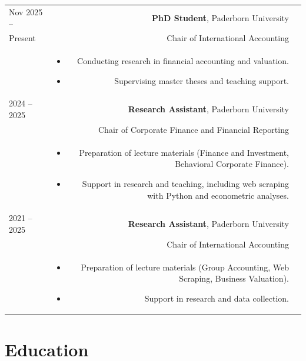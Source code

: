 \documentclass[11pt, a4paper]{article}
\newcommand{\entrygap}{\\[12pt]}
\newcommand{\liftlist}{\vspace*{-0.6em}}
\begin{document}
\begin{longtable}{L R}
    Nov 2025 -- & \textbf{PhD Student}, Paderborn University \\
    Present & Chair of International Accounting \\
    & \liftlist
      \begin{itemize}[nosep, leftmargin=*, itemsep=1.5pt]
        \item Conducting research in financial accounting and valuation.
        \item Supervising master theses and teaching support.
      \end{itemize} \entrygap

    2024 -- 2025 & \textbf{Research Assistant}, Paderborn University \\
    & Chair of Corporate Finance and Financial Reporting \\
    & \liftlist
      \begin{itemize}[nosep, leftmargin=*, itemsep=1.5pt]
        \item Preparation of lecture materials (Finance and Investment, Behavioral Corporate Finance).
        \item Support in research and teaching, including web scraping with Python and econometric analyses.
      \end{itemize} \entrygap

    2021 -- 2025 & \textbf{Research Assistant}, Paderborn University \\
    & Chair of International Accounting \\
    & \liftlist
      \begin{itemize}[nosep, leftmargin=*, itemsep=1.5pt]
        \item Preparation of lecture materials (Group Accounting, Web Scraping, Business Valuation).
        \item Support in research and data collection.
      \end{itemize} \\
\end{longtable}

\section*{Education}
\end{document}
